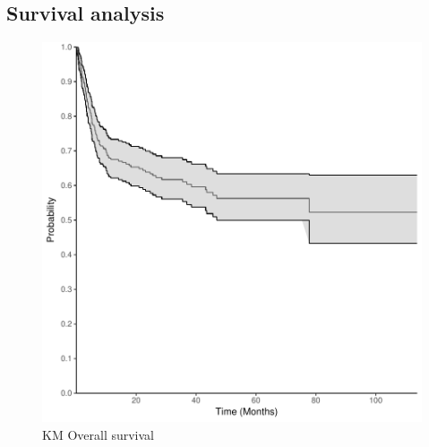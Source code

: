 \documentclass[a4paper,11pt] {article}
\begin{document}
\restoregeometry

\subsection{Survival analysis}
\begin{figure}
\begin{center}
\includegraphics{Rapport-fig1}
\end{center}
\caption{KM Overall survival}
\label{fig1}
\end{figure}
\end{document}
